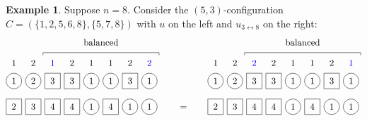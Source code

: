 \documentclass[submission]{FPSAC2018}
\newcommand{\0}{\phantom{c}}
\theoremstyle{plain}
\theoremstyle{definition}
\newtheorem{example}[thm]{Example}
\numberwithin{equation}{section}
\begin{document}
\begin{example}
Suppose $n = 8$.
Consider the $(5,3)$-configuration $C = (\{1,2,5,6,8\}, \{5,7,8\})$ with $u$ on the left and $u_{3 \leftrightarrow 8}$ on the right:
\[
\begin{tikzpicture}[baseline=-3]
  \def\sc{0.75}   %
  \def\lll{1.7}   %
  \def\ll{1}   %
  \def\l{0}   %
  \node[color=blue] at (3*\sc,\lll) {$1$};
  \node[color=blue] at (8*\sc,\lll) {$2$};
  \foreach \i in {1,5,6} { \node at (\i*\sc,\lll) {$1$}; }
  \foreach \i in {2,4,7} { \node at (\i*\sc,\lll) {$2$}; }
  \foreach \i in {1,2,5,6,8} { \draw (\i*\sc,\ll) circle (0.3); }
  \foreach \i in {3,4,7} { \draw (\i*\sc-.3,\ll-.3) rectangle +(0.6,+0.6); }
  \foreach \i in {1,5,6,8} { \node at (\i*\sc,\ll) {$1$}; }
  \foreach \i in {2} { \node at (\i*\sc,\ll) {$2$}; }
  \foreach \i in {3,4,7} { \node at (\i*\sc,\ll) {$3$}; }
  \foreach \i in {5,7,8} { \draw (\i*\sc,\l) circle (0.3); }
  \foreach \i in {1,2,3,4,6} { \draw (\i*\sc-.3,\l-.3) rectangle +(0.6,+0.6); }
  \foreach \i in {3,4,6} { \node at (\i*\sc,\l) {$4$}; }
  \foreach \i in {2} { \node at (\i*\sc,\l) {$3$}; }
  \foreach \i in {1} { \node at (\i*\sc,\l) {$2$}; }
  \foreach \i in {5,7,8} { \node at (\i*\sc,\l) {$1$}; }
  \draw (2.5*\sc,2) -- (2.5*\sc,2.1) -- (8.5*\sc,2.1) -- (8.5*\sc,2);
  \node at (5.5*\sc,2.5) {balanced};
\end{tikzpicture}
\hspace{20pt} = \hspace{20pt}
\begin{tikzpicture}[baseline=-3]
  \def\sc{0.75}   %
  \def\lll{1.7}   %
  \def\ll{1}   %
  \def\l{0}   %
  \node[color=blue] at (8*\sc,\lll) {$1$};
  \node[color=blue] at (3*\sc,\lll) {$2$};
  \foreach \i in {1,5,6} { \node at (\i*\sc,\lll) {$1$}; }
  \foreach \i in {2,4,7} { \node at (\i*\sc,\lll) {$2$}; }
  \foreach \i in {1,2,5,6,8} { \draw (\i*\sc,\ll) circle (0.3); }
  \foreach \i in {3,4,7} { \draw (\i*\sc-.3,\ll-.3) rectangle +(0.6,+0.6); }
  \foreach \i in {1,5,6,8} { \node at (\i*\sc,\ll) {$1$}; }
  \foreach \i in {3,4,7} { \node at (\i*\sc,\ll) {$3$}; }
  \foreach \i in {2} { \node at (\i*\sc,\ll) {$2$}; }
  \foreach \i in {5,7,8} { \draw (\i*\sc,\l) circle (0.3); }
  \foreach \i in {1,2,3,4,6} { \draw (\i*\sc-.3,\l-.3) rectangle +(0.6,+0.6); }
  \foreach \i in {3,4,6} { \node at (\i*\sc,\l) {$4$}; }
  \foreach \i in {2} { \node at (\i*\sc,\l) {$3$}; }
  \foreach \i in {1} { \node at (\i*\sc,\l) {$2$}; }
  \foreach \i in {5,7,8} { \node at (\i*\sc,\l) {$1$}; }
  \draw (2.5*\sc,2) -- (2.5*\sc,2.1) -- (8.5*\sc,2.1) -- (8.5*\sc,2);
  \node at (5.5*\sc,2.5) {balanced};
\end{tikzpicture}
\]
\end{example}
\end{document}
